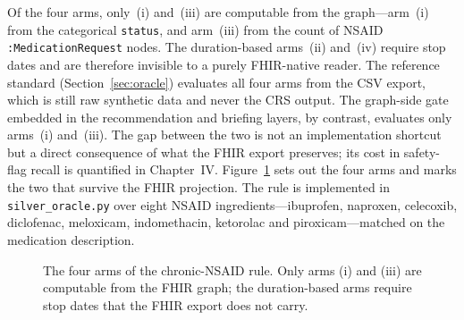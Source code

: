 Of the four arms, only~(i) and~(iii) are computable from
the graph---arm~(i) from the categorical \texttt{status}, and arm~(iii) from the count of
NSAID \texttt{:MedicationRequest} nodes. The duration-based arms~(ii) and~(iv) require stop
dates and are therefore invisible to a purely FHIR-native reader. The reference standard
(Section~\ref{sec:oracle}) evaluates all four arms from the CSV export, which is still raw
synthetic data and never the CRS output. The graph-side gate embedded in the recommendation
and briefing layers, by contrast, evaluates only arms~(i) and~(iii). The gap between the two is not an
implementation shortcut but a direct consequence of what the FHIR export preserves; its cost
in safety-flag recall is quantified in Chapter~IV. Figure~\ref{fig:chronicity} sets out the
four arms and marks the two that survive the FHIR projection. The rule is implemented in
\texttt{silver\_oracle.py} over eight NSAID ingredients---ibuprofen, naproxen, celecoxib,
diclofenac, meloxicam, indomethacin, ketorolac and piroxicam---matched on the medication
description.

\begin{figure}[htbp]
\centering
{}
\caption{The four arms of the chronic-NSAID rule. Only arms (i) and (iii) are computable
from the FHIR graph; the duration-based arms require stop dates that the FHIR export does
not carry.}
\label{fig:chronicity}
\end{figure}

